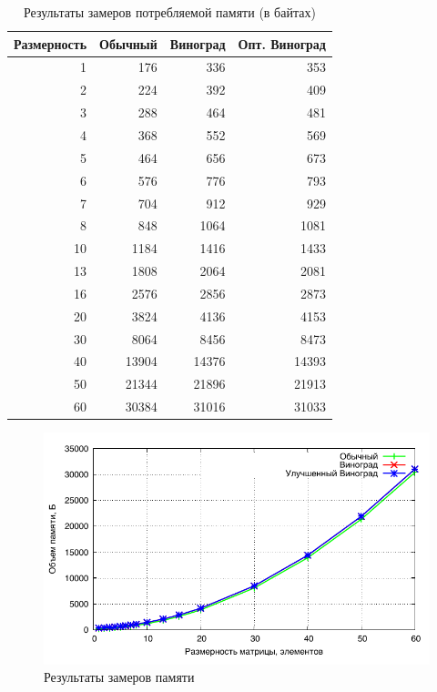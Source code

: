 \begin{table}[h]
  \caption{\label{table:memory} Результаты замеров потребляемой памяти (в байтах)}
  \begin{center}
    \begin{tabular}{|r|r|r|r|}
      \hline
      Размерность & Обычный & Виноград & Опт. Виноград\\ \hline
      1 & 176 & 336 & 353 \\ \hline
      2 & 224 & 392 & 409 \\ \hline
      3 & 288 & 464 & 481 \\ \hline
      4 & 368 & 552 & 569 \\ \hline
      5 & 464 & 656 & 673 \\ \hline
      6 & 576 & 776 & 793 \\ \hline
      7 & 704 & 912 & 929 \\ \hline
      8 & 848 & 1064 & 1081 \\ \hline
      10 & 1184 & 1416 & 1433 \\ \hline
      13 & 1808 & 2064 & 2081 \\ \hline
      16 & 2576 & 2856 & 2873 \\ \hline
      20 & 3824 & 4136 & 4153 \\ \hline
      30 & 8064 & 8456 & 8473 \\ \hline
      40 & 13904 & 14376 & 14393 \\ \hline
      50 & 21344 & 21896 & 21913 \\ \hline
      60 & 30384 & 31016 & 31033 \\ \hline
    \end{tabular}
  \end{center}
\end{table}

\newpage

\noindent
\begin{figure}[h!]
	\centering
    \includegraphics[width=0.75\linewidth]{../data/memory.pdf}
    \caption{Результаты замеров памяти}
    \label{img:memory}
\end{figure}

